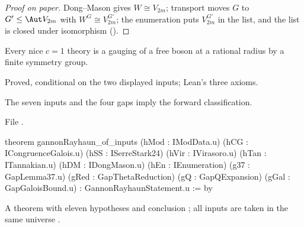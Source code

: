 \begin{proof}[Proof on paper]
Dong--Mason gives $W\cong V_{2m}$; transport moves $G$ to $G'\le\Aut V_{2m}$ with $W^G\cong V_{2m}^{G'}$; the
enumeration puts $V_{2m}^{G'}$ in the list, and the list is closed under isomorphism ().
\end{proof}

\begin{physics}
Every nice $c=1$ theory is a gauging of a free boson at a rational radius by a finite symmetry group.
\end{physics}

\begin{status}
Proved, conditional on the two displayed inputs; Lean's three axioms.
\end{status}

\begin{theorem}\label{l22:thm:conditional}
The seven inputs and the four gaps imply the forward classification.
\end{theorem}
\noindent File .
\begin{leancode}
theorem gannonRayhaun_of_inputs
    (hMod : IModData.{u}) (hCG : ICongruenceGalois.{u}) (hSS : ISerreStark24)
    (hVir : IVirasoro.{u}) (hTan : ITannakian.{u}) (hDM : IDongMason.{u})
    (hEn : IEnumeration)
    (g37 : GapLemma37.{u}) (gRed : GapThetaReduction) (gQ : GapQExpansion)
    (gGal : GapGaloisBound.{u}) :
    GannonRayhaunStatement.{u} := by
\end{leancode}

\begin{dictionary}
A theorem with eleven  hypotheses and conclusion ; all inputs are
taken in the same universe .
\end{dictionary}

